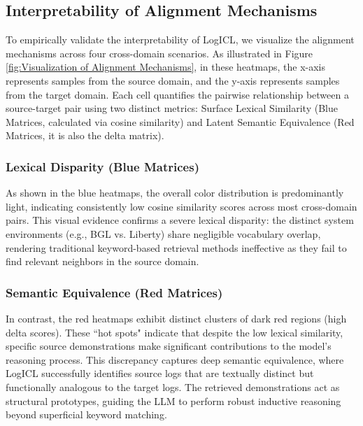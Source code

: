 \documentclass[lettersize,journal]{IEEEtran}
\begin{document}
\subsection{Interpretability of Alignment Mechanisms}

To empirically validate the interpretability of LogICL, we visualize the alignment mechanisms across four cross-domain scenarios. As illustrated in Figure \ref{fig:Visualization of Alignment Mechanisms}, in these heatmaps, the x-axis represents samples from the source domain, and the y-axis represents samples from the target domain. Each cell quantifies the pairwise relationship between a source-target pair using two distinct metrics: Surface Lexical Similarity (Blue Matrices, calculated via cosine similarity) and Latent Semantic Equivalence (Red Matrices, it is also the delta matrix).

\subsubsection{Lexical Disparity (Blue Matrices)}
As shown in the blue heatmaps, the overall color distribution is predominantly light, indicating consistently low cosine similarity scores across most cross-domain pairs. This visual evidence confirms a severe lexical disparity: the distinct system environments (e.g., BGL vs. Liberty) share negligible vocabulary overlap, rendering traditional keyword-based retrieval methods ineffective as they fail to find relevant neighbors in the source domain.

\subsubsection{Semantic Equivalence (Red Matrices)}
In contrast, the red heatmaps exhibit distinct clusters of dark red regions (high delta scores). These ``hot spots" indicate that despite the low lexical similarity, specific source demonstrations make significant contributions to the model's reasoning process. This discrepancy captures deep semantic equivalence, where LogICL successfully identifies source logs that are textually distinct but functionally analogous to the target logs. The retrieved demonstrations act as structural prototypes, guiding the LLM to perform robust inductive reasoning beyond superficial keyword matching.
\end{document}

